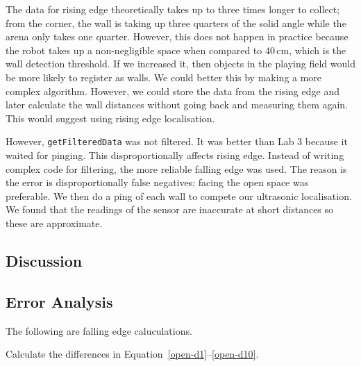 \documentclass[twocolumn]{article}
\begin{document}
The data for rising edge theoretically takes up to three times longer to collect; from the corner, the wall is taking up three quarters of the solid angle while the arena only takes one quarter. However, this does not happen in practice because the robot takes up a non-negligible space when compared to 40\,cm, which is the wall detection threshold. If we increased it, then objects in the playing field would be more likely to register as walls. We could better this by making a more complex algorithm. However, we could store the data from the rising edge and later calculate the wall distances without going back and measuring them again. This would suggest using rising edge localisation.

However, {\tt getFilteredData} was not filtered. It was better than Lab 3\cite{alexneil3} because it waited for pinging. This disproportionally affects rising edge. Instead of writing complex code for filtering, the more reliable falling edge was used. The reason is the error is disproportionally false negatives; facing the open space was preferable. We then do a ping of each wall to compete our ultrasonic localisation. We found that the readings of the sensor are inaccurate at short distances so these are approximate.

\cite{lab4}

\subsection{Discussion}

\subsection{Error Analysis}

The following are falling edge caluculations.

Calculate the differences in Equation~\ref{open-d1}--\ref{open-d10}.
\end{document}
